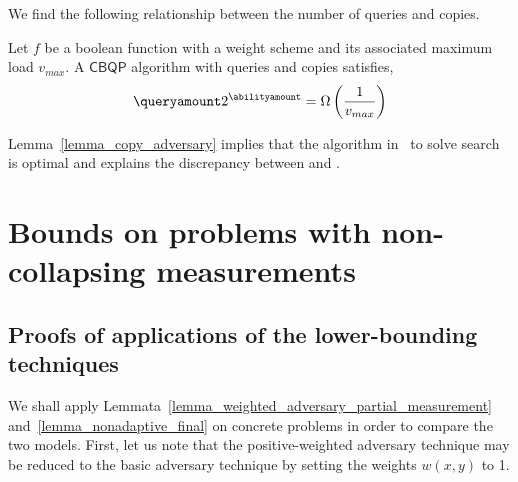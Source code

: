 We find the following relationship between the number of queries and copies.

\begin{lemma}\label{lemma_copy_adversary}
    Let $f$ be a boolean function with a weight scheme and its associated maximum load $v_{max}$. A $\mathsf{CBQP}$ algorithm with \queryamount queries and \abilityamount copies satisfies,
        \begin{align*}
            \queryamount 2^{\abilityamount} = \Omega\left(\frac{1}{v_{max}}\right)
        \end{align*}
\end{lemma}

Lemma~\ref{lemma_copy_adversary} implies that the algorithm in~\cite{grover_search_no_signaling_principle} to solve search is optimal and explains the discrepancy between \copybqpname and \pdqpname.

\section{Bounds on problems with non-collapsing measurements}

\subsection{Proofs of applications of the lower-bounding techniques}\label{subsection_proof_application}

We shall apply Lemmata~\ref{lemma_weighted_adversary_partial_measurement} and~\ref{lemma_nonadaptive_final} on concrete problems in order to compare the two models. First, let us note that the positive-weighted adversary technique may be reduced to the basic adversary technique by setting the weights $w(x,y)$ to 1.

